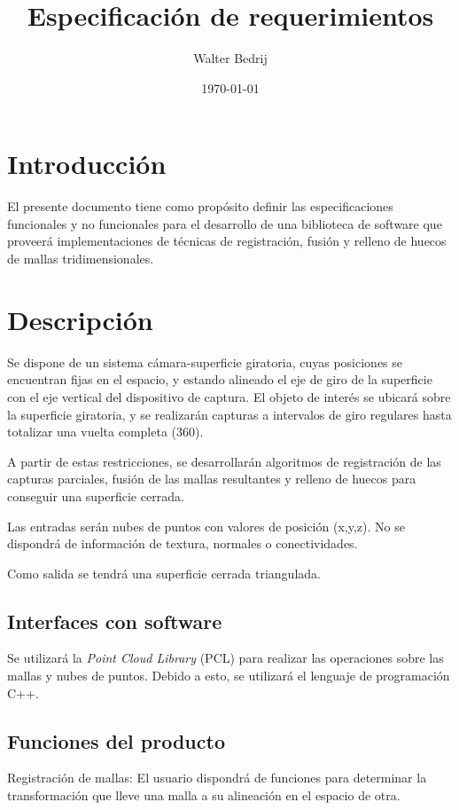 \documentclass{pfc}
\title{Especificación de requerimientos}
\author{Walter Bedrij}
\date{\today}
\begin{document}
	\maketitle
	\tableofcontents
	\section{Introducción}
	El presente documento tiene como propósito definir las especificaciones
	funcionales y no funcionales para el desarrollo de una biblioteca de
	software que proveerá implementaciones de técnicas de registración, fusión
	y relleno de huecos de mallas tridimensionales.

	\section{Descripción}
		Se dispone de un sistema cámara-superficie giratoria, cuyas posiciones
		se encuentran fijas en el espacio, y estando alineado el eje de giro de
		la superficie con el eje vertical del dispositivo de captura.
		El objeto de interés se ubicará sobre la superficie giratoria, y se
		realizarán capturas a intervalos de giro regulares
		hasta totalizar una vuelta completa (360\textdegree).

		A partir de estas restricciones, se desarrollarán algoritmos de
		registración de las capturas parciales,
		fusión de las mallas resultantes
		y relleno de huecos para conseguir una superficie cerrada.

		Las entradas serán nubes de puntos con valores de posición (x,y,z).
		No se dispondrá de información de textura, normales o conectividades.

		Como salida se tendrá una superficie cerrada triangulada.

		\subsection{Interfaces con software}
			Se utilizará la \emph{Point Cloud Library} (PCL)
			para realizar las operaciones sobre las mallas y nubes de puntos.
			Debido a esto, se utilizará el lenguaje de programación C++.

		\subsection{Funciones del producto}
			Registración de mallas:
				El usuario dispondrá de funciones para
				determinar la transformación que lleve una malla
				a su alineación en el espacio de otra.
\end{document}
